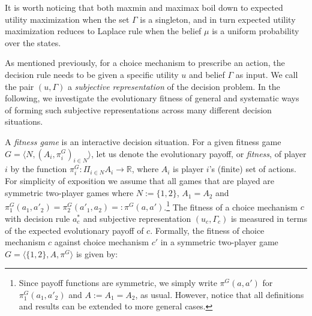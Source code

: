 \documentclass[fleqn,reqno,12pt]{article}
\theoremstyle{Satz}
\theoremstyle{Bsp}
\begin{document}
It is worth noticing that both maxmin and maximax boil down to expected utility maximization
when the set $\Gamma$ is a singleton, and in turn expected utility maximization reduces to
Laplace rule when the belief $\mu$ is a uniform probability over the states.  

As mentioned previously, for a choice mechanism to prescribe an action, the decision rule needs
to be given a specific utility $u$ and belief $\Gamma$ as input. We call the pair $(u,\Gamma)$ a \textit{subjective
  representation} of the decision problem. In the following, we investigate the evolutionary fitness of general and systematic ways of
forming such subjective representations across many different decision situations. 


A \emph{fitness game} is an interactive decision situation.  For a given fitness game
$G=\langle N, (A_i,\pi^G_i)_{i \in N} \rangle$, let us denote the evolutionary payoff, or
\textit{fitness}, of player $i$ by the function
$\pi^G_i: \Pi_{i \in N} A_i \rightarrow \mathbb{R}$, where $A_i$ is player $i$'s (finite) set
of actions. For simplicity of exposition we assume that all games that are played are symmetric
two-player games where $N:=\{1,2\}$, $A_1 = A_2 $ and
$\pi^G_1(a_1, a'_2)= \pi^G_2(a'_1, a_2)=:\pi^G(a,a')$.\footnote{Since payoff functions are
  symmetric, we simply write $\pi^G(a, a')$ for $\pi^G_1(a_1, a'_2)$ and $A:=A_1=A_2$, as
  usual. However, notice that all definitions and results can be extended to more general
  cases.} The fitness of a choice mechanism $c$ with decision rule $a_{c}^{*}$ and subjective representation $(u_c,\Gamma_c)$ is
measured in terms of the expected evolutionary payoff of $c$.
Formally, the fitness of choice mechanism $c$ against choice mechanism $c'$ in a
symmetric two-player game $G=\langle \{1,2\}, A, \pi^G \rangle$ is given by:
\end{document}
